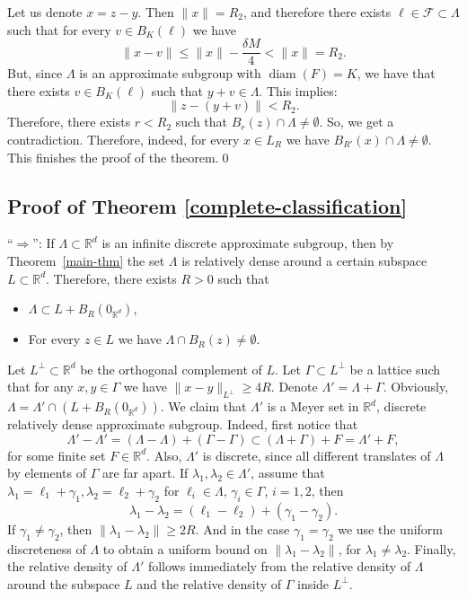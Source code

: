 \documentclass[10pt]{amsart}
\DeclareMathOperator{\diam}{diam}
\newcommand{\cF}{\mathcal{F}}
\newcommand{\bR}{\mathbb{R}}
\theoremstyle{plain}
\theoremstyle{definition}
\let\Subsection\subsection\let\Subsubsection\subsubsection
\begin{document}
Let us denote $x = z-y$. Then $\| x \| = R_2$, and therefore there exists $\ell \in \cF \subset \Lambda$ such that for every $v \in B_K(\ell)$ we have
\[
\| x - v \| \le \| x \| - \frac{\delta M}{4} < \| x \|=R_2.
\]
But, since $\Lambda$ is an approximate subgroup with $\diam(F) = K$, we have that there exists $v \in B_K(\ell)$ such that $y + v \in \Lambda$. This implies:
\[
\| z- (y+v) \| < R_2.
\]
Therefore, there exists $r < R_2$ such that $B_{r}(z) \cap \Lambda \neq \emptyset$. So, we get a contradiction. Therefore, indeed, for every $x \in L_R$ we have $B_{R'}(x) \cap \Lambda \neq \emptyset$. This finishes the proof of the theorem.\qed

\Subsection{Proof of Theorem \ref{complete-classification}}

``$\Rightarrow$'': If $\Lambda \subset \bR^d$ is an infinite discrete approximate subgroup, then by Theorem~\ref{main-thm} the set $\Lambda$ is relatively dense around a certain subspace $L \subset \bR^d$. Therefore, there exists $R > 0$ such that
\begin{itemize}
\item $\Lambda \subset L + B_R(0_{\bR^d})$,
\item For every $z \in L$ we have $\Lambda \cap B_R(z) \neq \emptyset$.
\end{itemize}
Let $L^{\perp} \subset \bR^d$ be the orthogonal complement of $L$. Let $\Gamma \subset L^{\perp}$ be a lattice such that for any $x,y \in \Gamma$ we have $\| x - y \|_{L^{\perp}} \ge 4R$. Denote $\Lambda ' = \Lambda + \Gamma$. Obviously, $\Lambda = \Lambda' \cap (L+B_R(0_{\bR^d}))$. We claim that $\Lambda'$ is a Meyer set in $\bR^d$, \ie discrete relatively dense approximate subgroup. Indeed, first notice that
\[
\Lambda' - \Lambda' = (\Lambda - \Lambda) + (\Gamma - \Gamma) \subset (\Lambda + \Gamma) + F = \Lambda' + F,
\]
for some finite set $F \in \bR^d$. Also, $\Lambda'$ is discrete, since all different translates of $\Lambda$ by elements of $\Gamma$ are far apart. If $\lambda_1,\lambda_2 \in \Lambda'$, assume that $\lambda_1 = \ell_1+\gamma_1, \lambda_2 = \ell_2 + \gamma_2$ for $\ell_i \in \Lambda$, $\gamma_i \in \Gamma$, $i=1,2$, then
\[
\lambda_1 - \lambda_2 = (\ell_1-\ell_2) + (\gamma_1-\gamma_2).
\]
If $\gamma_1 \neq \gamma_2$, then $\| \lambda_1 - \lambda_2 \| \ge 2R$. And in the case $\gamma_1 = \gamma_2$ we use the uniform discreteness of $\Lambda$ to obtain a uniform bound on $\| \lambda_1 - \lambda_2 \|$, for $\lambda_1 \neq \lambda_2$. Finally, the relative density of $\Lambda'$ follows immediately from the relative density of $\Lambda$ around the subspace $L$ and the relative density of $\Gamma$ inside $L^{\perp}$.
\end{document}
